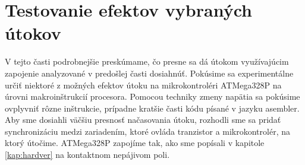 \section{Testovanie efektov vybraných útokov}
V tejto časti podrobnejšie preskúmame, čo presne sa dá útokom využívajúcim zapojenie analyzované v predošlej časti dosiahnúť. Pokúsime sa experimentálne určiť niektoré z možných efektov útoku na mikrokontroléri ATMega328P na úrovni makroinštrukcií procesora. Pomocou techniky zmeny napätia sa pokúsime ovplyvniť rôzne inštrukcie, prípadne kratšie časti kódu písané v jazyku asembler. Aby sme dosiahli väčšiu presnosť načasovania útoku, rozhodli sme sa pridať synchronizáciu medzi zariadením, ktoré ovláda tranzistor a mikrokontrolér, na ktorý útočime. ATMega328P zapojíme tak, ako sme popísali v kapitole \ref{kap:hardver} na kontaktnom nepájivom poli.